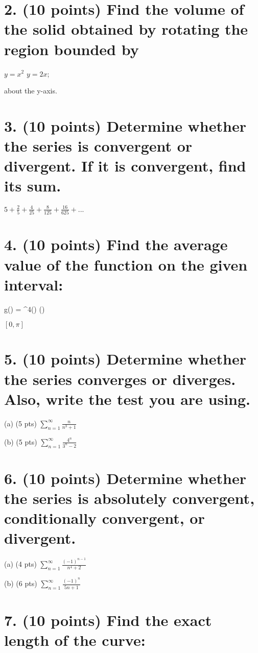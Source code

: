 \documentclass[12pt]{article}
\begin{document}
\section*{2. (10 points) Find the volume of the solid obtained by rotating the region bounded by}

$y=x^{2}$ $y=2x$;

about the y-axis.

\newpage

\section*{3. (10 points) Determine whether the series is convergent or divergent. If it is convergent, find its sum.}

$5+\frac{2}{5}+\frac{4}{25}+\frac{8}{125}+\frac{16}{625}+...$ 

\newpage

\section*{4. (10 points) Find the average value of the function on the given interval:}

g(\theta) = \cos^4(\theta) \sin(\theta)

$[0,\pi]$ 

\newpage

\section*{5. (10 points) Determine whether the series converges or diverges. Also, write the test you are using.}

(a) (5 pts) $\sum_{n=1}^{\infty}\frac{n}{n^{3}+1}$  

(b) (5 pts) $\sum_{n=1}^{\infty}\frac{4^{n}}{3^{n}-2}$  

\newpage

\section*{6. (10 points) Determine whether the series is absolutely convergent, conditionally convergent, or divergent.}

(a) (4 pts) $\sum_{n=1}^{\infty}\frac{(-1)^{n-1}}{n^{4}+2}$

(b) (6 pts) $\sum_{n=1}^{\infty}\frac{(-1)^{n}}{5n+1}$  

\newpage

\section*{7. (10 points) Find the exact length of the curve:}
\end{document}
